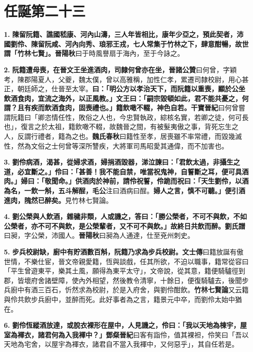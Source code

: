 \chapter{任誕第二十三}

\textbf{1.} \textbf{陳留阮籍、譙國嵇康、河內山濤，三人年皆相比，康年少亞之，預此契者，沛國劉伶、陳留阮咸、河內向秀、琅邪王戎，七人常集于竹林之下，肆意酣暢，故世謂「竹林七賢」。}{\footnotesize \textbf{晉陽秋}曰于時風譽扇于海內，至于今詠之。}

\textbf{2.} \textbf{阮籍遭母喪，在晉文王坐進酒肉，司隸何曾亦在坐，}{\footnotesize \textbf{晉諸公贊}曰何曾，字穎考，陳郡陽夏人，父夔，魏太僕，曾以高雅稱，加性仁孝，累遷司隸校尉，用心甚正，朝廷師之，仕晉至太宰。}\textbf{曰：「明公方以孝治天下，而阮籍以重喪，顯於公坐飲酒食肉，宜流之海外，以正風教。」文王曰：「嗣宗毀頓如此，君不能共憂之，何謂？且有疾而飲酒食肉，固喪禮也。」籍飲噉不輟，神色自若。}{\footnotesize \textbf{干寶晉紀}曰何曾嘗謂阮籍曰「卿恣情任性，敗俗之人也，今忠賢執政，綜核名實，若卿之徒，何可長也」，復言之於太祖，籍飲噉不輟，故魏晉之間，有被髮夷傲之事，背死忘生之人，反謂行禮者，籍為之也。\textbf{魏氏春秋}曰籍性至孝，居喪雖不率常禮，而毀幾滅性，然為文俗之士何曾等深所讐疾，大將軍司馬昭愛其通偉，而不加害也。}

\textbf{3.} \textbf{劉伶病酒，渴甚，從婦求酒，婦捐酒毀器，涕泣諫曰：「君飲太過，非攝生之道，必宜斷之。」伶曰：「甚善！我不能自禁，唯當祝鬼神，自誓斷之耳，便可具酒肉。」婦曰：「敬聞命。」供酒肉於神前，請伶祝誓，伶跪而祝曰：「天生劉伶，以酒為名，一飲一斛，五斗解酲，}{\footnotesize \textbf{毛公}注曰酒病曰酲。}\textbf{婦人之言，慎不可聽。」便引酒進肉，隗然已醉矣。}{\footnotesize 見竹林七賢論。}

\textbf{4.} \textbf{劉公榮與人飲酒，雜穢非類，人或譏之，答曰：「勝公榮者，不可不與飲，不如公榮者，亦不可不與飲，是公榮輩者，又不可不與飲。」故終日共飲而醉。}{\footnotesize \textbf{劉氏譜}曰昶，字公榮，沛國人。\textbf{晉陽秋}曰昶為人通達，仕至兗州刺史。}

\textbf{5.} \textbf{步兵校尉缺，廚中有貯酒數百斛，阮籍乃求為步兵校尉。}{\footnotesize \textbf{文士傳}曰籍放誕有傲世情，不樂仕宦，晉文帝親愛籍，恆與談戲，任其所欲，不迫以職事，籍常從容曰「平生曾遊東平，樂其土風，願得為東平太守」，文帝說，從其意，籍便騎驢徑到郡，皆壞府舍諸壁障，使內外相望，然後教令清寧，十餘日，便復騎驢去，後聞步兵廚中有酒三百石，忻然求為校尉，於是入府舍，與劉伶酣飲。\textbf{竹林七賢論}又云籍與伶共飲步兵廚中，並醉而死。此好事者為之言，籍景元中卒，而劉伶太始中猶在。}

\textbf{6.} \textbf{劉伶恆縱酒放達，或脫衣裸形在屋中，人見譏之，伶曰：「我以天地為棟宇，屋室為褌衣，諸君何為入我褌中？」}{\footnotesize \textbf{鄧粲晉紀}曰客有詣伶，值其裸袒，伶笑曰「吾以天地為宅舍，以屋宇為褌衣，諸君自不當入我褌中，又何惡乎」，其自任若是。}

